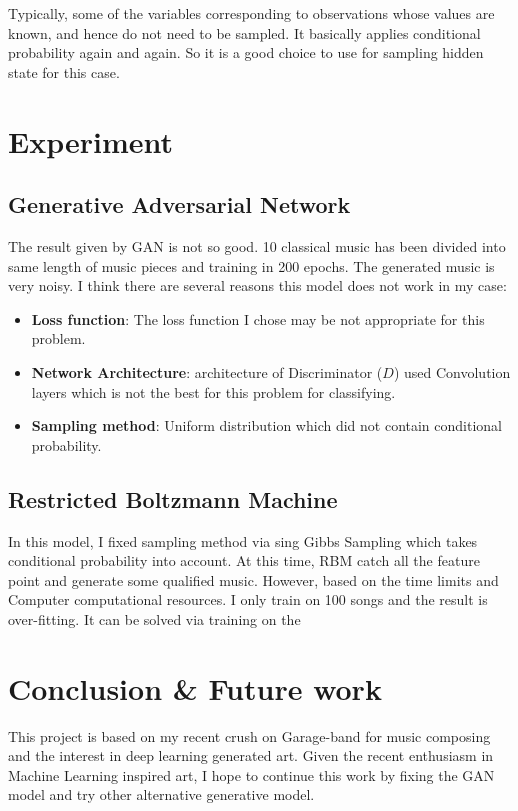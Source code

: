 \documentclass[journal, a4paper]{IEEEtran}
\begin{document}
    Typically, some of the variables corresponding to observations whose values are known, and hence do not need to be sampled. It basically applies conditional probability again and again. So it is a good choice to use for sampling hidden state for this case.

\section{Experiment}
\subsection{Generative Adversarial Network}
	The result given by GAN is not so good. 10 classical music has been divided into same length of music pieces and training in 200 epochs. The generated music is very noisy. I think there are several reasons this model does not work in my case:
\begin{itemize}
\item \textbf{Loss function}: The loss function I chose may be not appropriate for this problem.
\item \textbf{Network Architecture}: architecture of Discriminator ($D$) used Convolution layers which is not the best for this problem for classifying.
\item \textbf{Sampling method}: Uniform distribution which did not contain conditional probability.
\end{itemize}

\subsection{Restricted Boltzmann Machine}
In this model, I fixed sampling method via sing Gibbs Sampling which takes conditional probability into account. At this time, RBM catch all the feature point and generate some qualified music. However, based on the time limits and Computer computational resources. I only train on 100 songs and the result is over-fitting. It can be solved via training on the

\section{Conclusion \& Future work}

This project is based on my recent crush on Garage-band for music composing and the interest in deep learning generated art. Given the recent enthusiasm in Machine Learning inspired art, I hope to continue this work by
fixing the GAN model and try other alternative generative model.
\end{document}
